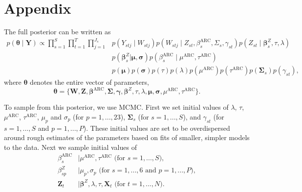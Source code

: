 \documentclass[11pt]{article}
\def\bbeta{\pmb{\beta}}
\def\bgamma{\pmb{\gamma}}
\def\bmu{\pmb{\mu}}
\def\bsigma{\pmb{\sigma}}
\def\bSigma{\pmb{\Sigma}}
\def\btheta{\pmb{\theta}}
\def\bX{\pmb{X}}
\def\bY{\pmb{Y}}
\def\bZ{\pmb{Z}}
\def\bW{\pmb{W}}
\begin{document}
\newpage
\section{Appendix}\label{sec:appendix}

The full posterior can be written as
\begin{align*}
p(\btheta \mid \bY) \propto \prod_{s = 1}^S \prod_{t = 1}^T \prod_{j = 1}^{J_s} & p(Y_{stj} \mid W_{stj}) p(W_{stj} \mid Z_{st}, \beta_s^\text{ARC}, \Sigma_s, \gamma_{st}) p(Z_{st} \mid \bbeta_s^Z, \tau, \lambda) \\
& p(\bbeta_s^Z | \bmu, \bsigma) p(\beta_s^\text{ARC} \mid \mu^\text{ARC}, \tau^\text{ARC}) \\
& p(\bmu) p(\bsigma) p(\tau) p(\lambda) p(\mu^\text{ARC}) p(\tau^\text{ARC}) p(\bSigma_s) p(\gamma_{st}),
\end{align*}
where $\btheta$ denotes the entire vector of parameters, 
$$
\btheta = \{\bW, \bZ, \bbeta^\text{ARC}, \bSigma, \bgamma, \bbeta^Z, \tau, \lambda, \bmu, \bsigma, \mu^\text{ARC}, \tau^\text{ARC}\}.
$$

To sample from this posterior, we use MCMC. First we set initial values of $\lambda$, $\tau$, $\mu^\text{ARC}$, $\tau^\text{ARC}$, $\mu_p$ and $\sigma_p$ (for $p = 1, ..., 23$), $\bSigma_s$ (for $s = 1, ..., S$), and $\gamma_{st}$ (for $s = 1, ..., S$ and $p = 1, ..., P$). These initial values are set to be overdispersed around rough estimates of the parameters based on fits of smaller, simpler models to the data. Next we sample initial values of
\begin{align}
\beta_s^\text{ARC} &\mid \mu^\text{ARC}, \tau^\text{ARC}\text{ (for }s = 1, ..., S), \\
\beta^Z_{sp} &\mid \mu_p, \sigma_p\text{ (for }s = 1, ..., 6\text{ and }p = 1, ..., P), \\
\bZ_t &\mid \bbeta^Z, \lambda, \tau, \bX_t\text{ (for }t = 1, ..., N).
\end{align}
\end{document}
